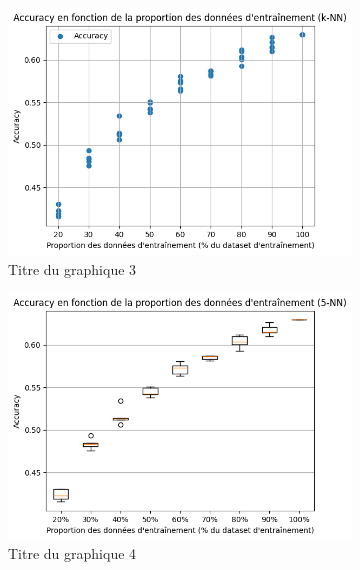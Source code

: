 \documentclass[12pt]{article}
\begin{document}
\begin{figure}[H]
\begin{subfigure}[t]{0.35\textwidth}
        \centering
        \includegraphics[width=\textwidth]{static/knn_goo_5_raw.png}
        \caption{Titre du graphique 3}
    \end{subfigure}
    \hfill
    \begin{subfigure}[t]{0.35\textwidth}
        \centering
        \includegraphics[width=\textwidth]{static/knn_goo_5.png}
        \caption{Titre du graphique 4}
    \end{subfigure}
    \hfill
    \begin{subfigure}[t]{0.35\textwidth}
        \centering

\end{subfigure}
\end{figure}
\end{document}
